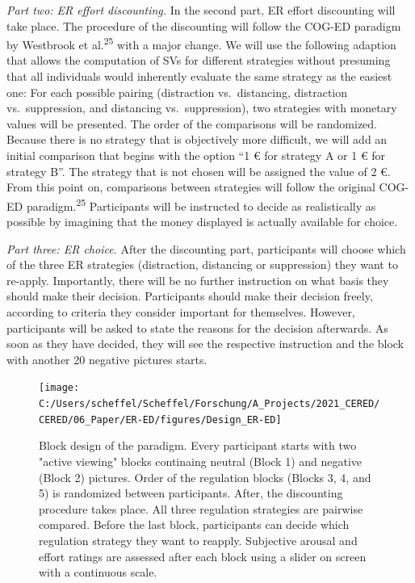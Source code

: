 \documentclass[
  english,
  man,floatsintext]{apa6}
\begin{document}
\emph{Part two: ER effort discounting.} In the second part, ER effort discounting will take place.
The procedure of the discounting will follow the COG-ED paradigm by Westbrook et al.\textsuperscript{25} with a major change.
We will use the following adaption that allows the computation of SVs for different strategies without presuming that all individuals would inherently evaluate the same strategy as the easiest one: For each possible pairing (distraction vs.~distancing, distraction vs.~suppression, and distancing vs.~suppression), two strategies with monetary values will be presented.
The order of the comparisons will be randomized.
Because there is no strategy that is objectively more difficult, we will add an initial comparison that begins with the option ``1 € for strategy A or 1 € for strategy B''.
The strategy that is not chosen will be assigned the value of 2 €.
From this point on, comparisons between strategies will follow the original COG-ED paradigm.\textsuperscript{25}
Participants will be instructed to decide as realistically as possible by imagining that the money displayed is actually available for choice.

\emph{Part three: ER choice.} After the discounting part, participants will choose which of the three ER strategies (distraction, distancing or suppression) they want to re-apply.
Importantly, there will be no further instruction on what basis they should make their decision.
Participants should make their decision freely, according to criteria they consider important for themselves.
However, participants will be asked to state the reasons for the decision afterwards.
As soon as they have decided, they will see the respective instruction and the block with another 20 negative pictures starts.

\begin{figure}
\texttt{[image: C:/Users/scheffel/Scheffel/Forschung/A\_Projects/2021\_CERED/CERED/06\_Paper/ER-ED/figures/Design\_ER-ED]} \caption{Block design of the paradigm. Every participant starts with two "active viewing" blocks continaing neutral (Block 1) and negative (Block 2) pictures. Order of the regulation blocks (Blocks 3, 4, and 5) is randomized between participants. After, the discounting procedure takes place. All three regulation strategies are pairwise compared. Before the last block, participants can decide which regulation strategy they want to reapply. Subjective arousal and effort ratings are assessed after each block using a slider on screen with a continuous scale.}\label{fig:DesignERED}
\end{figure}
\end{document}
